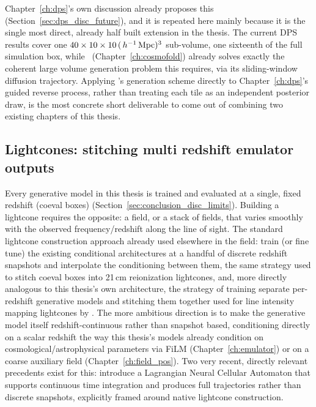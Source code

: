 Chapter~\ref{ch:dps}'s own discussion already proposes this (Section~\ref{sec:dps_disc_future}), and it is repeated here mainly because it is the single most direct, already half built extension in the thesis. The current DPS results cover one $40\times10\times10\,(\,h^{-1}\,\mathrm{Mpc})^3$ sub-volume, one sixteenth of the full simulation box, while \FOLD\ (Chapter~\ref{ch:cosmofold}) already solves exactly the coherent large volume generation problem this requires, via its sliding-window diffusion trajectory. Applying \FOLD's generation scheme directly to Chapter~\ref{ch:dps}'s guided reverse process, rather than treating each tile as an independent posterior draw, is the most concrete short deliverable to come out of combining two existing chapters of this thesis.

\subsection{Lightcones: stitching multi redshift emulator outputs}
\label{sec:conclusion_future_lightcone}

Every generative model in this thesis is trained and evaluated at a single, fixed redshift (coeval boxes) (Section~\ref{sec:conclusion_disc_limits}). Building a lightcone requires the opposite: a field, or a stack of fields, that varies smoothly with the observed frequency/redshift along the line of sight. The standard lightcone construction approach already used elsewhere in the field: train (or fine tune) the existing conditional architectures at a handful of discrete redshift snapshots and interpolate the conditioning between them, the same strategy used to stitch coeval boxes into 21\,cm reionization lightcones, and, more directly analogous to this thesis's own architecture, the strategy of training separate per-redshift generative models and stitching them together used for line intensity mapping lightcones by \citet[CosmoGLINT]{Moriwaki_2025}. The more ambitious direction is to make the generative model itself redshift-continuous rather than snapshot based, conditioning directly on a scalar redshift the way this thesis's models already condition on cosmological/astrophysical parameters via FiLM (Chapter~\ref{ch:emulator}) or on a coarse auxiliary field (Chapter~\ref{ch:field_pos}). Two very recent, directly relevant precedents exist for this: \citet{jacobus_lnca_2026} introduce a Lagrangian Neural Cellular Automaton that supports continuous time integration and produces full trajectories rather than discrete snapshots, explicitly framed around native lightcone construction.

